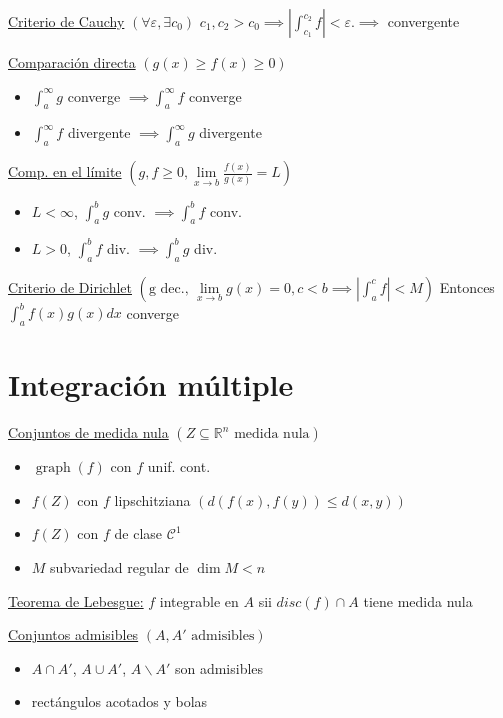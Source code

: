 \documentclass[12pt]{article}
\newcommand{\real}{\mathbb{R}}
\newcommand{\abs}[1]{\left\vert #1 \right\vert}
\DeclareMathOperator{\graph}{graph}
\begin{document}
\begin{multicols}{3}
    \underline{Criterio de Cauchy} $\left( \forall \varepsilon, \exists c_0 \right)$
    $c_1, c_2 > c_0 \implies \abs{\int_{c_1}^{c_2} f} < \varepsilon. \implies$ convergente
    
    
    \underline{Comparación directa} $\left( g(x) \geq f(x) \geq 0 \right)$
    \begin{itemize}
        \item $\int_{a}^{\infty} g$ converge $\implies \int_{a}^{\infty} f$ converge
        \item $\int_{a}^{\infty} f$ divergente $\implies \int_{a}^{\infty} g$ divergente
    \end{itemize}
    
    \underline{Comp. en el límite} $\left( g, f \geq 0,
    \lim\limits_{x \to b} \frac{f(x)}{g(x)} = L \right)$
    \begin{itemize}
        \item $L < \infty$, $\int_{a}^{b} g$ conv. $\implies \int_{a}^{b} f$ conv.
        \item $L > 0$, $\int_{a}^{b} f$ div. $\implies \int_{a}^{b} g$ div.
    \end{itemize}
    
    \underline{Criterio de Dirichlet} $\left(\text{g dec., }\lim\limits_{x \to b} g(x) = 0,
    c < b \implies \abs{\int_{a}^{c} f} < M\right)$
    Entonces $\int_{a}^{b} f(x)g(x)dx$ converge
    
    \section{Integración múltiple}
    
    \underline{Conjuntos de medida nula} $\left( Z \subseteq \real^n \text{ medida nula} \right)$
    \begin{itemize}
        \item $\graph(f)$ con $f$ unif. cont.
        \item $f(Z)$ con $f$ lipschitziana $\left( d(f(x),f(y)) \leq d(x,y) \right)$
        \item $f(Z)$ con $f$ de clase $\mathcal{C}^1$
        \item $M$ subvariedad regular de $\dim M < n$
    \end{itemize}
    
    \underline{Teorema de Lebesgue:}
    $f$ integrable en $A$ sii $disc(f) \cap A$ tiene medida nula
    
    \underline{Conjuntos admisibles} $\left( A, A' \text{ admisibles} \right)$
    \begin{itemize}
        \item $A \cap A'$, $A \cup A'$, $A \smallsetminus A'$ son admisibles
        \item rectángulos acotados y bolas
    \end{itemize}
    

\end{multicols}
\end{document}

